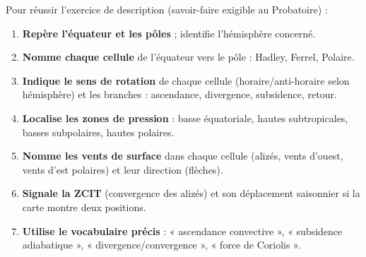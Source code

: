 \documentclass[11pt]{article}
\begin{document}
\begin{methode}
Pour réussir l'exercice de description (savoir-faire exigible au Probatoire) :
\begin{enumerate}
\item \textbf{Repère l'équateur et les pôles} ; identifie l'hémisphère concerné.
\item \textbf{Nomme chaque cellule} de l'équateur vers le pôle : Hadley, Ferrel, Polaire.
\item \textbf{Indique le sens de rotation} de chaque cellule (horaire/anti-horaire selon hémisphère) et les branches : ascendance, divergence, subsidence, retour.
\item \textbf{Localise les zones de pression} : basse équatoriale, hautes subtropicales, basses subpolaires, hautes polaires.
\item \textbf{Nomme les vents de surface} dans chaque cellule (alizés, vents d'ouest, vents d'est polaires) et leur direction (flèches).
\item \textbf{Signale la ZCIT} (convergence des alizés) et son déplacement saisonnier si la carte montre deux positions.
\item \textbf{Utilise le vocabulaire précis} : « ascendance convective », « subsidence adiabatique », « divergence/convergence », « force de Coriolis ».
\end{enumerate}
\end{methode}
\end{document}
